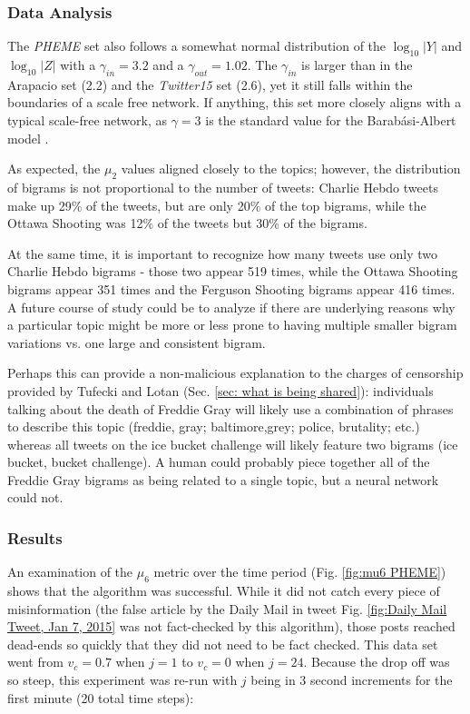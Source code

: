 \documentclass[preprint,review,12pt]{elsarticle}
\begin{document}
\subsubsection{Data Analysis}
The \textit{PHEME} set also follows a somewhat normal distribution of the $\log_{10}|Y|$ and $\log_{10}|Z|$ with a $\gamma_{in} = 3.2$ and a $\gamma_{out} = 1.02$. The $\gamma_{in}$ is larger than in the Arapacio set (2.2) and the \textit{Twitter15} set (2.6), yet it still falls within the boundaries of a scale free network. If anything, this set more closely aligns with a typical scale-free network, as $\gamma = 3$ is the standard value for the Barab{\'a}si-Albert model \cite{barabasi1999emergence,barabasi2000scale,pastor2001epidemic}.

As expected, the $\mu_2$ values aligned closely to the topics; however, the distribution of bigrams is not proportional to the number of tweets: Charlie Hebdo tweets make up 29\% of the tweets, but are only 20\% of the top bigrams, while the Ottawa Shooting was 12\% of the tweets but 30\% of the bigrams.

At the same time, it is important to recognize how many tweets use only two Charlie Hebdo bigrams - those two appear 519 times, while the Ottawa Shooting bigrams appear 351 times and the Ferguson Shooting bigrams appear 416 times. A future course of study could be to analyze if there are underlying reasons why a particular topic might be more or less prone to having multiple smaller bigram variations vs. one large and consistent bigram.

Perhaps this can provide a non-malicious explanation to the charges of censorship provided by Tufecki and Lotan (Sec. \ref{sec: what is being shared}): individuals talking about the death of Freddie Gray will likely use a combination of phrases to describe this topic (freddie, gray; baltimore,grey; police, brutality; etc.) whereas all tweets on the ice bucket challenge will likely feature two bigrams (ice bucket, bucket challenge). A human could probably piece together all of the Freddie Gray bigrams as being related to a single topic, but a neural network could not.

\subsubsection{Results}
An examination of the $\mu_6$ metric over the time period (Fig. \ref{fig:mu6 PHEME}) shows that the algorithm was successful. While it did not catch every piece of misinformation (the false article by the Daily Mail in tweet Fig. \ref{fig:Daily Mail Tweet, Jan 7, 2015} was not fact-checked by this algorithm), those posts reached dead-ends so quickly that they did not need to be fact checked. This data set went from $v_c = 0.7$ when $j = 1$ to $v_c = 0$ when $j = 24$. Because the drop off was so steep, this experiment was re-run with $j$ being in 3 second increments for the first minute (20 total time steps):
\end{document}
